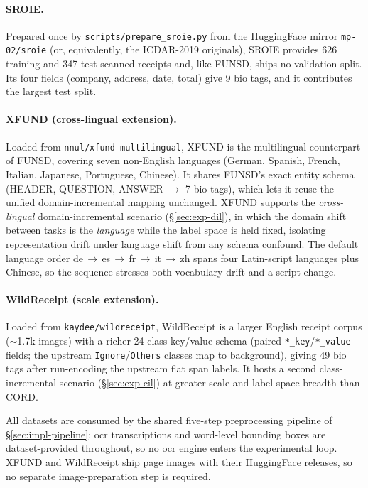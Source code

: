 \paragraph{SROIE.} Prepared once by \texttt{scripts/prepare\_sroie.py} from the
HuggingFace mirror \texttt{mp-02/sroie} (or, equivalently, the ICDAR-2019
originals), SROIE provides 626 training and 347 test scanned receipts and, like
FUNSD, ships no validation split. Its four fields (company, address, date,
total) give 9 \gls{bio} tags, and it contributes the largest test split.

\paragraph{XFUND (cross-lingual extension).} Loaded from
\texttt{nnul/xfund-multilingual}, XFUND is the multilingual counterpart of FUNSD,
covering seven non-English languages (German, Spanish, French, Italian, Japanese,
Portuguese, Chinese). It shares FUNSD's exact entity schema (HEADER, QUESTION,
ANSWER $\to$ 7 \gls{bio} tags), which lets it reuse the unified domain-incremental
mapping unchanged. XFUND supports the \emph{cross-lingual} domain-incremental
scenario (\S\ref{sec:exp-dil}), in which the domain shift between tasks is the
\emph{language} while the label space is held fixed, isolating representation drift
under language shift from any schema confound. The default language order
de\,$\rightarrow$\,es\,$\rightarrow$\,fr\,$\rightarrow$\,it\,$\rightarrow$\,zh spans
four Latin-script languages plus Chinese, so the sequence stresses both vocabulary
drift and a script change.

\paragraph{WildReceipt (scale extension).} Loaded from
\texttt{kaydee/wildreceipt}, WildReceipt is a larger English receipt corpus
($\sim$1.7k images) with a richer 24-class key/value schema (paired
\texttt{*\_key}/\texttt{*\_value} fields; the upstream \texttt{Ignore}/\texttt{Others}
classes map to background), giving 49 \gls{bio} tags after run-encoding the upstream
flat span labels. It hosts a second class-incremental scenario
(\S\ref{sec:exp-cil}) at greater scale and label-space breadth than CORD.

All datasets are consumed by the shared five-step preprocessing pipeline of
\S\ref{sec:impl-pipeline}; \gls{ocr} transcriptions and word-level bounding boxes
are dataset-provided throughout, so no \gls{ocr} engine enters the experimental
loop. XFUND and WildReceipt ship page images with their HuggingFace releases, so no
separate image-preparation step is required.

